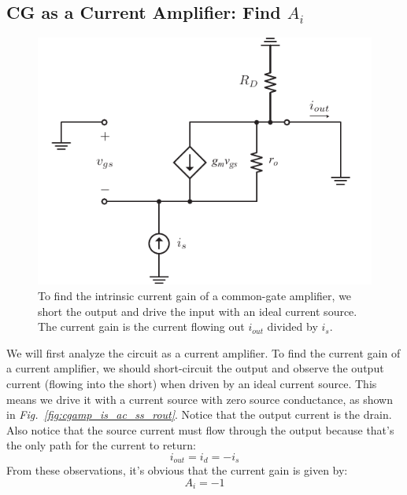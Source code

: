 \subsection{CG as a Current Amplifier\texorpdfstring{: Find $A_{i}$}{}}
\begin{figure}[tb]
\centering
\includegraphics[scale=.9]{cgamp_is_ac_ss_short}
\caption{To find the intrinsic current gain of a common-gate amplifier, we short the output and drive the input with an ideal current source.  The current gain is the current flowing out $i_{out}$ divided by $i_s$.}
\label{fig:cgamp_is_ac_ss_short}
\end{figure}
We will first analyze the circuit as a current amplifier.  To find the current gain of a current amplifier, we should short-circuit the output and observe the output current (flowing into the short) when driven by an ideal current source.  This means we drive it with a current source with zero source conductance, as shown in \emph{Fig.~\ref{fig:cgamp_is_ac_ss_rout}}.  Notice that the output current is the drain.  Also notice that the source current must flow through the output because that's the only path for the current to return:
    \begin{equation}
        {i_{out}} = {i_d} =  - {i_s}
    \end{equation}
From these observations, it's obvious that the current gain is given by:
    \begin{equation}
        {A_i} =  - 1
    \end{equation}
